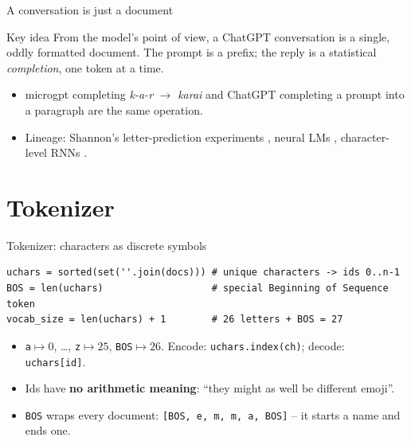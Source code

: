 \documentclass[aspectratio=169,11pt]{beamer}
\newcommand{\code}[1]{\lstinline[basicstyle=\ttfamily\small]|#1|}
\begin{document}
\begin{frame}{A conversation is just a document}
\begin{block}{Key idea}
From the model's point of view, a ChatGPT conversation is a single, oddly formatted document. The prompt is a prefix; the reply is a statistical \emph{completion}, one token at a time.
\end{block}
\begin{itemize}
  \item microgpt completing \emph{k-a-r} $\to$ \emph{karai} and ChatGPT completing a prompt into a paragraph are the same operation.
  \item Lineage: Shannon's letter-prediction experiments \parencite{shannon1951prediction}, neural LMs \parencite{bengio2003neural}, character-level RNNs \parencite{sutskever2011generating,graves2013generating,karpathy2015rnn}.
\end{itemize}
\end{frame}

\section{Tokenizer}
\begin{frame}[fragile]{Tokenizer: characters as discrete symbols}
\begin{lstlisting}
uchars = sorted(set(''.join(docs))) # unique characters -> ids 0..n-1
BOS = len(uchars)                   # special Beginning of Sequence token
vocab_size = len(uchars) + 1        # 26 letters + BOS = 27
\end{lstlisting}
\begin{itemize}
  \item \texttt{a}$\mapsto 0$, \dots, \texttt{z}$\mapsto 25$, \texttt{BOS}$\mapsto 26$. Encode: \code{uchars.index(ch)}; decode: \code{uchars[id]}.
  \item Ids have \textbf{no arithmetic meaning}: ``they might as well be different emoji''.
  \item \texttt{BOS} wraps every document: \texttt{[BOS, e, m, m, a, BOS]} -- it starts a name and ends one.
\end{itemize}
\end{frame}
\end{document}
